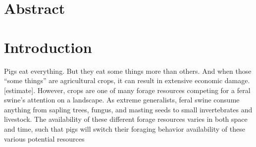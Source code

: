 \documentclass[a4paper]{article}
\begin{document}














\doublespacing
\linenumbers

\section*{Abstract}

\section*{Introduction}

Pigs eat everything. But they eat some things more than others. And when those ``some things'' are agricultural crops, it can result in extensive economic damage. [estimate].  However, crops are one of many forage resources competing for a feral swine's attention on a landscape.  As extreme generalists, feral swine consume anything from sapling trees, fungus, and masting seeds to small invertebrates and livestock. The availability of these different forage resources varies in both space and time, such that pigs will switch their foraging behavior  availability of these various potential resources  



\end{document}
